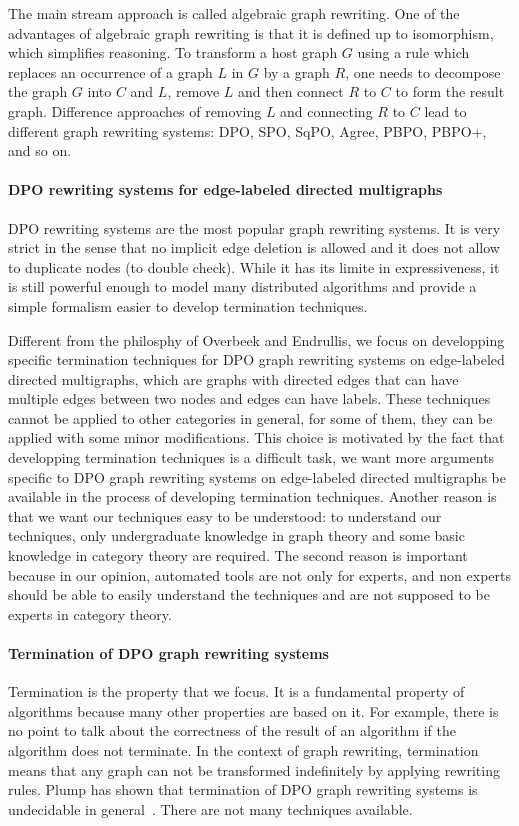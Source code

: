  The main stream approach is called algebraic graph rewriting. One of the advantages of algebraic graph rewriting is that it is defined up to isomorphism, which simplifies reasoning. 
  To transform a host graph $G$ using a rule which replaces an occurrence of a graph $L$ in $G$ by a graph $R$, one needs to decompose the graph $G$ into $C$ and $L$, remove $L$ and then connect $R$ to $C$ to form the result graph. Difference approaches of removing $L$ and connecting $R$ to $C$ lead to different graph rewriting systems: DPO, SPO, SqPO, Agree, PBPO, PBPO+, and so on.

 \paragraph{DPO rewriting systems for edge-labeled directed multigraphs}
DPO rewriting systems are the most popular graph rewriting systems. It is very strict in the sense that no implicit edge deletion is allowed and it does not allow to duplicate nodes (to double check). While it has its limite in expressiveness, it is still powerful enough to model many distributed algorithms and provide a simple formalism easier to develop termination techniques.

Different from the philosphy of Overbeek and Endrullis, we focus on 
developping specific termination techniques for DPO graph rewriting systems on
edge-labeled directed multigraphs, which are graphs with directed edges that can have multiple edges between two nodes and edges can have labels. These techniques cannot be applied to other categories in general, for some of them, they can be applied with some minor modifications. This choice is motivated by the fact that developping termination techniques is a difficult task, we want more arguments specific to DPO graph rewriting systems on edge-labeled directed multigraphs be available in the process of developing termination techniques. Another reason is that we want our techniques easy to be understood: to understand our techniques, only undergraduate knowledge in graph theory and some basic knowledge in category theory are required. The second reason is important because in our opinion, automated tools are not only for experts, and non experts should be able to easily understand the techniques and are not supposed to be experts in category theory.

\paragraph{Termination of DPO graph rewriting systems}
Termination is the property that we focus. It is a fundamental property of algorithms because many other properties are based on it. For example, there is no point to talk about the correctness of the result of an algorithm if the algorithm does not terminate. In the context of graph rewriting, termination means that any graph can not be transformed indefinitely by applying rewriting rules. Plump has shown that termination of DPO graph rewriting systems is undecidable in general~\cite{plump1998terminationundecidable}.
There are not many techniques available.

